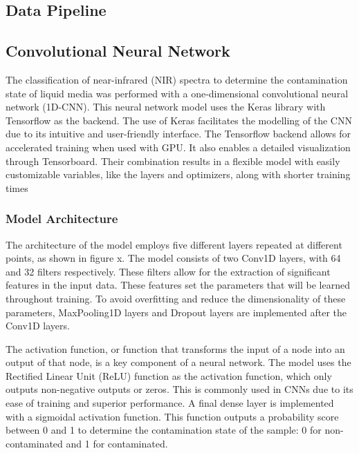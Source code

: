 \documentclass[12pt]{report}
\renewcommand{\cite}{\supercite}
\begin{document}
\subsection{Data Pipeline}

\subsection{Convolutional Neural Network}

The classification of near-infrared (NIR) spectra to determine the contamination state of liquid media was performed with a one-dimensional convolutional neural network (1D-CNN). This neural network model uses the Keras library with Tensorflow as the backend. The use of Keras facilitates the modelling of the CNN due to its intuitive and user-friendly interface.\cite{kerasteam_keras} The Tensorflow backend allows for accelerated training when used with GPU.\cite{acecloudteam_2024_tensorflow} It also enables a detailed visualization through Tensorboard. Their combination results in a flexible model with easily customizable variables, like the layers and optimizers, along with shorter training times	

\subsubsection{Model Architecture}

The architecture of the model employs five different layers repeated at different points, as shown in figure x. The model consists of two Conv1D layers, with 64 and 32 filters respectively. These filters allow for the extraction of significant features in the input data.\cite{nisha_2020_applications} These features set the parameters that will be learned throughout training. To avoid overfitting and reduce the dimensionality of these parameters, MaxPooling1D layers and Dropout layers are implemented after the Conv1D layers.

The activation function, or function that transforms the input of a node into an output of that node, is a key component of a neural network. The model uses the Rectified Linear Unit (ReLU) function as the activation function, which only outputs non-negative outputs or zeros.\cite{brownlee_2019_a} This is commonly used in CNNs due to its ease of training and superior performance. A final dense layer is implemented with a sigmoidal activation function. This function outputs a probability score between 0 and 1 to determine the contamination state of the sample: 0 for non-contaminated and 1 for contaminated.\cite{saeed_2021_a} 
\end{document}
